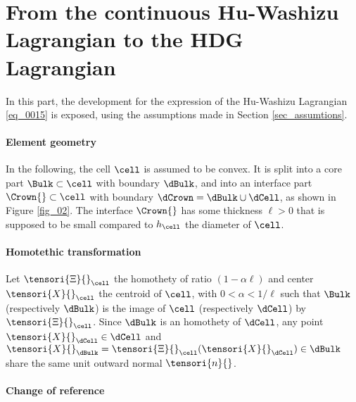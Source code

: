 \section{From the continuous Hu-Washizu Lagrangian to the HDG Lagrangian}
\label{sec_appendix_Hu_Washizu}

In this part, the development for the expression of the Hu-Washizu Lagrangian \eqref{eq_0015} is exposed, using the assumptions made in Section \ref{sec_assumtions}.

\paragraph{Element geometry}

In the following, the cell $\cell$ is assumed to be convex.
It is split into a core part $\Bulk \subset \cell$ with boundary $\dBulk$, and into an interface part $\Crown{} \subset \cell$ with boundary $\dCrown = \dBulk \cup \dCell$, as shown in Figure \ref{fig_02}. The interface $\Crown{}$ has some thickness $\ell > 0$ that is supposed to be small compared to $h_{\cell}$ the diameter of $\cell$.

\paragraph{Homotethic transformation}

Let $\tensori{\Xi}{}_{\cell}$ the homothety of ratio $(1 - \alpha \ell)$ and center $\tensori{X}{}_{\cell}$ the centroid of $\cell$, with $0 < \alpha < 1 / \ell$ such that $\Bulk$ (respectively $\dBulk$) is the image of $\cell$ (respectively $\dCell$) by $\tensori{\Xi}{}_{\cell}$. Since $\dBulk$ is an homothety of $\dCell$, any point $\tensori{X}{}_{\dCell} \in \dCell$ and $\tensori{X}{}_{\dBulk} = \tensori{\Xi}{}_{\cell}(\tensori{X}{}_{\dCell}) \in \dBulk$ share the same unit outward normal $\tensori{n}{}$.

\paragraph{Change of reference}

